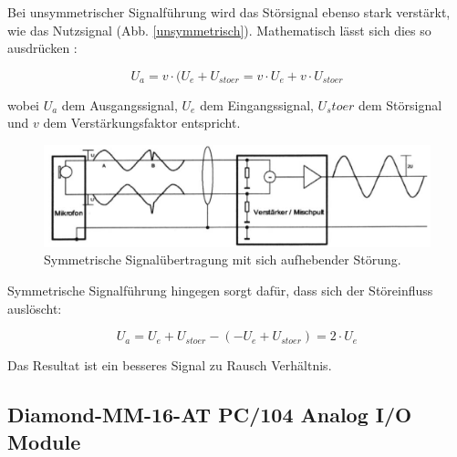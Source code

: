 \documentclass[12pt,a4paper]{scrartcl}
\begin{document}
Bei unsymmetrischer Signalführung wird das Störsignal ebenso stark verstärkt, wie das Nutzsignal (Abb. \ref{unsymmetrisch}). Mathematisch lässt sich dies so ausdrücken \citep{Sengpiel:2001fk}:

\begin{equation}
U_a = v \cdot (U_e + U_{stoer} = v \cdot U_e + v \cdot U_{stoer}
\end{equation}

wobei $U_a$ dem Ausgangssignal, $U_e$ dem Eingangssignal, $U_stoer$ dem Störsignal und $v$ dem Verstärkungsfaktor entspricht.

\begin{figure}[H]
\centering
\includegraphics[scale=.7]{symmetrisch.png}
\caption{Symmetrische Signalübertragung mit sich aufhebender Störung. \citep{Sengpiel:2001fk}}
\label{symmetrisch}
\end{figure}

Symmetrische Signalführung hingegen sorgt dafür, dass sich der Störeinfluss auslöscht:

\begin{equation}
U_a = U_e + U_{stoer} - ( -U_e + U_{stoer} ) = 2 \cdot U_e
\end{equation}

Das Resultat ist ein besseres Signal zu Rausch Verhältnis.


\subsection{Diamond-MM-16-AT PC/104 Analog I/O Module}
\end{document}
